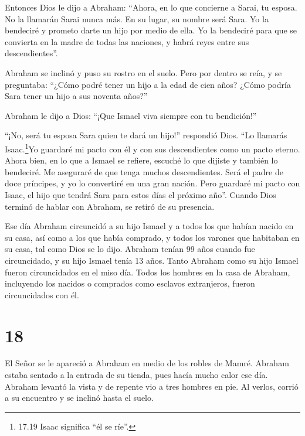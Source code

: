  Entonces Dios le dijo a Abraham: ``Ahora, en lo que
concierne a Sarai, tu esposa. No la llamarán Sarai nunca más. En su
lugar, su nombre será Sara.  Yo la bendeciré y prometo
darte un hijo por medio de ella. Yo la bendeciré para que se convierta
en la madre de todas las naciones, y habrá reyes entre sus
descendientes''.

 Abraham se inclinó y puso su rostro en el suelo. Pero por
dentro se reía, y se preguntaba: ``¿Cómo podré tener un hijo a la edad
de cien años? ¿Cómo podría Sara tener un hijo a sus noventa años?''

 Abraham le dijo a Dios: ``¡Que Ismael viva siempre con tu
bendición!''

 ``¡No, será tu esposa Sara quien te dará un hijo!''
respondió Dios. ``Lo llamarás Isaac.\footnote{17.19 Isaac significa ``él
  se ríe''.}Yo guardaré mi pacto con él y con sus descendientes como un
pacto eterno.  Ahora bien, en lo que a Ismael se refiere,
escuché lo que dijiste y también lo bendeciré. Me aseguraré de que tenga
muchos descendientes. Será el padre de doce príncipes, y yo lo
convertiré en una gran nación.  Pero guardaré mi pacto con
Isaac, el hijo que tendrá Sara para estos días el próximo año''.
 Cuando Dios terminó de hablar con Abraham, se retiró de su
presencia.

 Ese día Abraham circuncidó a su hijo Ismael y a todos los
que habían nacido en su casa, así como a los que había comprado, y todos
los varones que habitaban en su casa, tal como Dios se lo dijo.
 Abraham tenían 99 años cuando fue circuncidado,
 y su hijo Ismael tenía 13 años.  Tanto
Abraham como su hijo Ismael fueron circuncidados en el miso día.
 Todos los hombres en la casa de Abraham, incluyendo los
nacidos o comprados como esclavos extranjeros, fueron circuncidados con
él.

\hypertarget{section-17}{%
\section{18}\label{section-17}}

 El Señor se le apareció a Abraham en medio de los robles de
Mamré. Abraham estaba sentado a la entrada de su tienda, pues hacía
mucho calor ese día.  Abraham levantó la vista y de repente
vio a tres hombres en pie. Al verlos, corrió a su encuentro y se inclinó
hasta el suelo.

